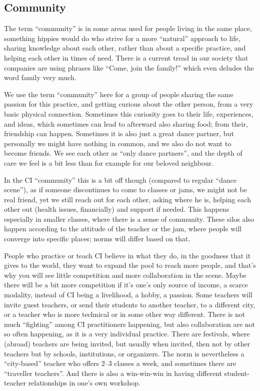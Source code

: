 \subsection{Community}\label{subsec:community}

The term ``community'' is in some areas used for people living in the same place, something hippies would do who strive for a more ``natural'' approach to life, sharing knowledge about each other, rather than about a specific practice, and helping each other in times of need.
There is a current tread in our society that companies are using phrases like ``Come, join the family!'' which even deludes the word family very much.

We use the term ``community'' here for a group of people sharing the same passion for this practice, and getting curious about the other person, from a very basic physical connection.
Sometimes this curiosity goes to their life, experiences, and ideas, which sometimes can lead to afterward also sharing food; from their, friendship can happen.
Sometimes it is also just a great dance partner, but personally we might have nothing in common, and we also do not want to become friends.
We see each other as ``only dance partners'', and the depth of care we feel is a bit less than for example for our beloved neighbour.

In the CI ``community'' this is a bit off though (compared to regular ``dance scene''), as if someone discontinues to come to classes or jams, we might not be real friend, yet we still reach out for each other, asking where he is, helping each other out (health issues, financially) and support if needed.
This happens especially in smaller classes, where there is a sense of community.
These silos also happen according to the attitude of the teacher or the jam, where people will converge into specific places; norms will differ based on that.

People who practice or teach CI believe in what they do, in the goodness that it gives to the world, they want to expand the pool to reach more people, and that's why you will see little competition and more collaboration in the scene.
Maybe there will be a bit more competition if it's one's only source of income, a scarce modality, instead of CI being a livelihood, a hobby, a passion.
Some teachers will invite guest teachers, or send their students to another teacher, to a different city, or a teacher who is more technical or in some other way different.
There is not much ``fighting'' among CI practitioners happening, but also collaboration are not so often happening, as it is a very individual practice.
There are festivals, where (abroad) teachers are being invited, but usually when invited, then not by other teachers but by schools, institutions, or organizers.
The norm is nevertheless a ``city-based'' teacher who offers 2--3 classes a week, and sometimes there are ``traveller teachers''.
And there is also a win-win-win in having different student-teacher relationships in one's own workshop.


